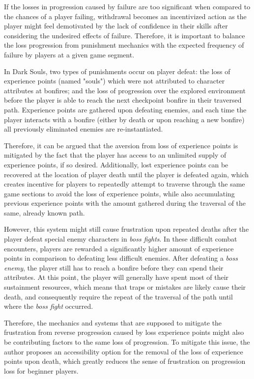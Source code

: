 If the losses in progression caused by failure are too significant when compared to the chances of a player failing, withdrawal becomes an incentivized action as the player might feel demotivated by the lack of confidence in their skills after considering the undesired effects of failure. Therefore, it is important to balance the loss progression from punishment mechanics with the expected frequency of failure by players at a given game segment.

In Dark Souls, two types of punishments occur on player defeat: the loss of experience points (named "souls") which were not attributed to character attributes at bonfires; and the loss of progression over the explored environment before the player is able to reach the next checkpoint bonfire in their traversed path. Experience points are gathered upon defeating enemies, and each time the player interacts with a bonfire (either by death or upon reaching a new bonfire) all previously eliminated enemies are re-instantiated.

Therefore, it can be argued that the aversion from loss of experience points is mitigated by the fact that the player has access to an unlimited supply of experience points, if so desired. Additionally, lost experience points can be recovered at the location of player death until the player is defeated again, which creates incentive for players to repeatedly attempt to traverse through the same game sections to avoid the loss of experience points, while also accumulating previous experience points with the amount gathered during the traversal of the same, already known path.

However, this system might still cause frustration upon repeated deaths after the player defeat special enemy characters in \emph{boss fights}. In these difficult combat encounters, players are rewarded a significantly higher amount of experience points in comparison to defeating less difficult enemies. After defeating a \emph{boss enemy}, the player still has to reach a bonfire before they can spend their attributes. At this point, the player will generally have spent most of their sustainment resources, which means that traps or mistakes are likely cause their death, and consequently require the repeat of the traversal of the path until where the \emph{boss fight} occurred.

Therefore, the mechanics and systems that are supposed to mitigate the frustration from reverse progression caused by loss experience points might also be contributing factors to the same loss of progression. To mitigate this issue, the author proposes an accessibility option for the removal of the loss of experience points upon death, which greatly reduces the sense of frustration on progression loss for beginner players.

